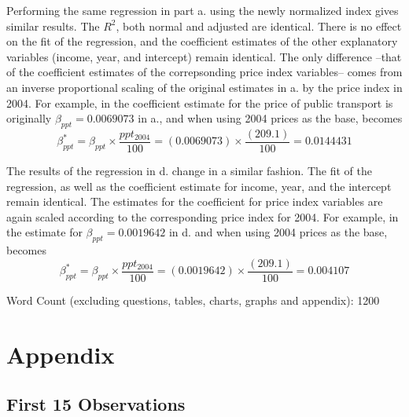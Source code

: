 \documentclass{article}
\begin{document}
\begin{enumerate}[label=\alph*.]
Performing the same regression in part a. using the newly normalized index gives similar results. The $R^2$, both normal and adjusted are identical. There is no effect on the fit of the regression, and the coefficient estimates of the other explanatory variables (income, year, and intercept) remain identical. The only difference --that of the coefficient estimates of the correpsonding price index variables-- comes from an inverse proportional scaling of the original estimates in a. by the price index in 2004.	 For example, in the coefficient estimate for the price of public transport is originally $\beta_{ppt} = 0.0069073 $ in a., and when using 2004 prices as the base, becomes
$$\beta_{ppt}^* = \beta_{ppt} \times  \frac{ppt_{2004}}{100} = (0.0069073) \times \frac{(209.1)}{100} = 0.0144431 $$ 

The results of the regression in d. change in a similar fashion. The fit of the regression, as well as the coefficient estimate for income, year, and the intercept remain identical. The estimates for the coefficient for price index variables are again scaled according to the corresponding price index for 2004. For example, in the estimate for $\beta_{ppt} = 0.0019642$ in d. and when using 2004 prices as the base, becomes 
$$\beta_{ppt}^* = \beta_{ppt} \times \frac{ppt_{2004}}{100} = (0.0019642) \times \frac{(209.1)}{100} = 0.004107$$   



\end{enumerate}


Word Count (excluding questions, tables, charts, graphs and appendix): 1200






\newpage
\section{Appendix}
\hypertarget{first15}{\subsection*{First 15 Observations}}
\end{document}
